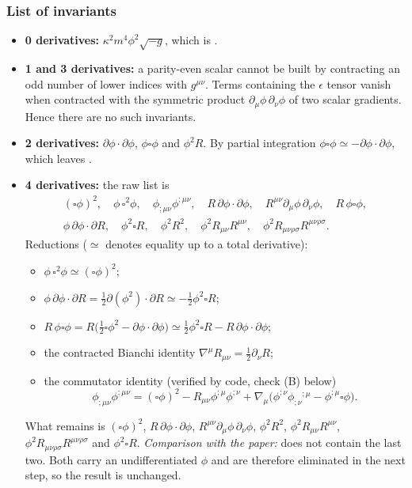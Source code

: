 \subsubsection{List of invariants}
\tD{}
\begin{itemize}[leftmargin=14pt]
\item \textbf{0 derivatives:} $\kappa^2m^4\phi^2\sqrt{-g}$, which is .
\item \textbf{1 and 3 derivatives:} a parity-even scalar cannot be built by contracting an odd number of lower indices with $g^{\mu\nu}$.
Terms containing the $\epsilon$ tensor vanish when contracted with the symmetric product $\partial_\mu\phi\,\partial_\nu\phi$ of two scalar gradients.
Hence there are no such invariants. \checkmark
\item \textbf{2 derivatives:} $\partial\phi\cdot\partial\phi$, $\phi\square\phi$ and $\phi^2R$.
By partial integration $\phi\square\phi\simeq-\partial\phi\cdot\partial\phi$, which leaves . \checkmark
\item \textbf{4 derivatives:} the raw list is
\begin{equation*}
\begin{gathered}
(\square\phi)^2,\quad \phi\,\square^2\phi,\quad \phi_{;\mu\nu}\phi^{;\mu\nu},\quad R\,\partial\phi\cdot\partial\phi,\quad R^{\mu\nu}\partial_\mu\phi\,\partial_\nu\phi,\quad R\,\phi\square\phi,\\
\phi\,\partial\phi\cdot\partial R,\quad \phi^2\square R,\quad \phi^2R^2,\quad \phi^2R_{\mu\nu}R^{\mu\nu},\quad \phi^2R_{\mu\nu\rho\sigma}R^{\mu\nu\rho\sigma}.
\end{gathered}
\end{equation*}
Reductions ($\simeq$ denotes equality up to a total derivative):
\begin{itemize}[leftmargin=14pt]
\item $\phi\,\square^2\phi\simeq(\square\phi)^2$;
\item $\phi\,\partial\phi\cdot\partial R=\tfrac12\partial(\phi^2)\cdot\partial R\simeq-\tfrac12\phi^2\square R$;
\item $R\,\phi\square\phi=R\big(\tfrac12\square\phi^2-\partial\phi\cdot\partial\phi\big)\simeq\tfrac12\phi^2\square R-R\,\partial\phi\cdot\partial\phi$;
\item the contracted Bianchi identity $\nabla^\mu R_{\mu\nu}=\tfrac12\partial_\nu R$;
\item the commutator identity (verified by code, check (B) below)
\begin{equation}
\phi_{;\mu\nu}\phi^{;\mu\nu}=(\square\phi)^2-R_{\mu\nu}\phi^{;\mu}\phi^{;\nu}+\nabla_\mu\big(\phi^{;\nu}\phi_{;\nu}{}^{;\mu}-\phi^{;\mu}\square\phi\big).
\label{eq:ch7-commutator}
\end{equation}
\end{itemize}
What remains is
$(\square\phi)^2$, $R\,\partial\phi\cdot\partial\phi$, $R^{\mu\nu}\partial_\mu\phi\,\partial_\nu\phi$, $\phi^2R^2$, $\phi^2R_{\mu\nu}R^{\mu\nu}$, $\phi^2R_{\mu\nu\rho\sigma}R^{\mu\nu\rho\sigma}$ and $\phi^2\square R$.
\emph{Comparison with the paper:}  does not contain the last two.
Both carry an undifferentiated $\phi$ and are therefore eliminated in the next step, so the result is unchanged.
\end{itemize}

